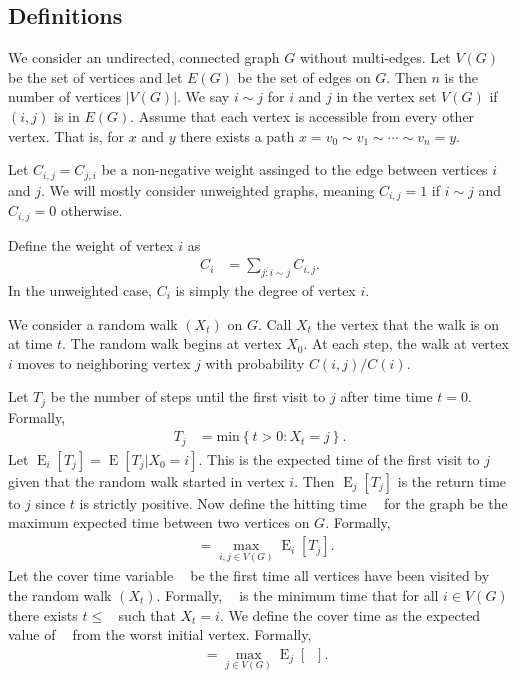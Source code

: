 \documentclass[12pt]{article}
\theoremstyle{definition}
\DeclareMathOperator{\E}{\mathrm{E}}		     %
\DeclareMathOperator{\cov}{\uptau_\textrm{cov}}  %
\DeclareMathOperator{\tcov}{t_\textrm{cov}}      %
\DeclareMathOperator{\hit}{t_{\textrm{hit}}}     %
\begin{document}
\subsection{Definitions}
We consider an undirected, connected graph $G$ without multi-edges.
Let $V(G)$ be the set of vertices and let $E(G)$ be the set of edges on $G$.
Then $n$ is the number of vertices $|V(G)|$.
We say $i\sim j$ for $i$ and $j$ in the vertex set $V(G)$ if $(i,j)$ 
is in $E(G)$.
Assume that each vertex is accessible from every other vertex.
That is, for $x$ and $y$ there exists a path
$x=v_0 \sim v_1 \sim \cdots \sim v_n = y$.

Let $C_{i,j}=C_{j,i}$ be a non-negative weight assinged to the edge
between vertices $i$ and $j$.
We will mostly consider unweighted graphs,
meaning $C_{i,j} = 1$ if $i \sim j$ and $C_{i,j} = 0$ otherwise.

Define the weight of vertex $i$ as
\begin{align}
C_i &= \sum_{j:i \sim j} C_{i,j}. \nonumber
\end{align}
In the unweighted case, $C_i$ is simply the degree of vertex $i$.

We consider a random walk $(X_t)$ on $G$.
Call $X_t$ the vertex that the walk is on at time $t$.
The random walk begins at vertex $X_0$.
At each step, the walk at vertex $i$ moves to neighboring vertex
$j$ with probability $C(i,j)/C(i)$.

Let $T_{j}$ be the number of steps until the first visit to $j$
after time time $t=0$.
Formally,
\begin{align}
T_{j} &= \textrm{min} \left\{t > 0 : X_t = j \right\}. \nonumber
\end{align}
Let $\E_i[T_j] = \E[T_j | X_0 = i]$.
This is the expected time of the first visit to $j$ given
that the random walk started in vertex $i$.
Then $\E_j[T_j]$ is the return time to $j$
since $t$ is strictly positive.
Now define the hitting time $\hit$ for the graph
be the maximum expected time between two vertices on $G$.
Formally, 
\begin{align}
\hit &= \max_{i,j \in V(G)} \E_i[T_j]. \nonumber
\end{align}
Let the cover time variable $\cov$ be the first time all vertices have been
visited by the random walk $(X_t)$.
Formally, $\cov$ is the minimum time that for all $i \in V(G)$
there exists $t \leq \cov$ such that $X_t = i$.
We define the cover time as the expected value of $\cov$ from
the worst initial vertex.
Formally,
\begin{align}
\tcov &= \max_{j \in V(G)} \E_j[\cov] . \nonumber
\end{align}
\end{document}
